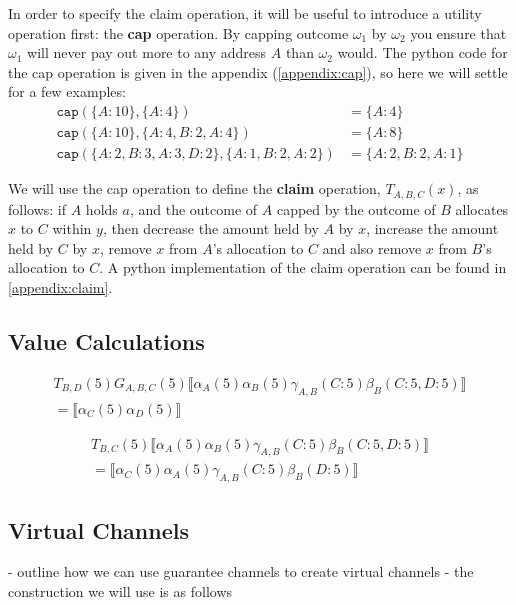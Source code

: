 \documentclass{article}
\theoremstyle{definition}
\newcommand{\adj}[1]{\llbracket #1 \rrbracket}
\begin{document}
In order to specify the claim operation, it will be useful to introduce a utility operation first: the \textbf{cap} operation.
By capping outcome $\omega_1$ by $\omega_2$ you ensure that $\omega_1$ will never pay out more to any address $A$ than $\omega_2$ would.
The python code for the cap operation is given in the appendix (\ref{appendix:cap}), so here we will settle for a few examples:
\begin{align*}
  \texttt{cap}(\{A: 10\}, \{A:4\}) &= \{A: 4 \} \\
  \texttt{cap}(\{A: 10\}, \{A:4, B: 2, A: 4\}) &= \{A: 8 \} \\
  \texttt{cap}(\{A: 2, B: 3, A: 3, D: 2\}, \{A: 1, B: 2, A: 2\}) &= \{A: 2, B: 2, A:1\}
\end{align*}

We will use the cap operation to define the \textbf{claim} operation, $T_{A,B,C}(x)$, as follows: if $A$ holds $a$, and the outcome of $A$ capped by the outcome of $B$ allocates $x$ to $C$ within $y$, then decrease the amount held by $A$ by $x$, increase the amount held by $C$ by $x$, remove $x$ from $A$'s allocation to $C$ and also remove $x$ from $B$'s allocation to $C$. A python implementation of the claim operation can be found in \ref{appendix:claim}.

\subsection{Value Calculations}

\begin{multline*}
  T_{B, D}(5)G_{A, B, C}(5)\adj{\alpha_A(5)\alpha_B(5)\gamma_{A, B}(C: 5)\beta_B(C: 5, D: 5)}\\= \adj{\alpha_C(5)\alpha_D(5)}
\end{multline*}

\begin{multline*}
  T_{B, C}(5)\adj{\alpha_A(5)\alpha_B(5)\gamma_{A, B}(C: 5)\beta_B(C: 5, D: 5)} \\= \adj{\alpha_C(5)\alpha_A(5)\gamma_{A, B}(C: 5)\beta_B(D: 5)}
\end{multline*}

\subsection{Virtual Channels}

- outline how we can use guarantee channels to create virtual channels
- the construction we will use is as follows
\end{document}
